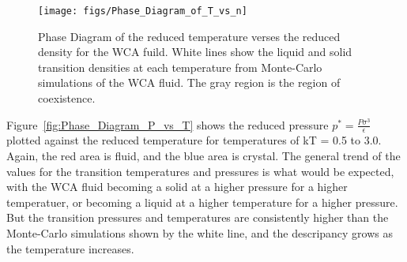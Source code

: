 \documentclass[double,12pt]{beavtex}
\begin{document}

\begin{figure}
  \centering
  \texttt{[image: figs/Phase\_Diagram\_of\_T\_vs\_n]}
  \caption{Phase Diagram of the reduced temperature verses the reduced density for the WCA fuild. 
  White lines show the liquid and solid transition densities at each temperature from 
  Monte-Carlo simulations of the WCA fluid. The gray region is the region of coexistence.}
  \label{fig:Phase_Diagram_of_T_vs_n}
\end{figure}

\begin{figure}
  \centering
  \label{fig:Phase_Diagram_of_T_vs_n_AS}
\end{figure}

Figure~\ref{fig:Phase_Diagram_P_vs_T} shows the reduced pressure $p^*=\frac{P\sigma^3}{\epsilon}$ 
plotted against the reduced temperature for temperatures of kT = 0.5 to 3.0. Again, the red area 
is fluid, and the blue area is crystal. The general trend of the values for the transition 
temperatures and pressures is what would be expected, with the WCA fluid becoming a solid at
a higher pressure for a higher temperatuer, or becoming a liquid at a higher temperature 
for a higher pressure. But the transition pressures and temperatures are consistently higher 
than the Monte-Carlo simulations shown by the white line, and the descripancy grows as 
the temperature increases. 
\end{document}
